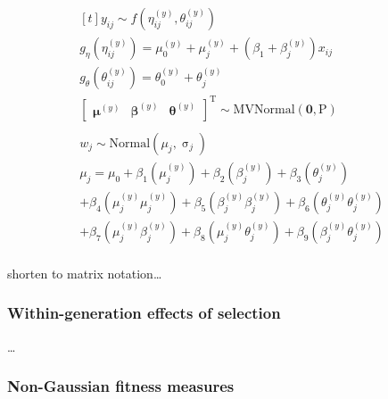 \documentclass{article}
\begin{document}
\begin{equation} \tag{3.1}\label{eq:3.1}
\begin{gathered}[t]
y_{ij} \sim f \left(\eta^{(y)}_{ij }, \theta^{(y)}_{ij} \right)  \\
g_\eta \left( \eta^{(y)}_{ij} \right) = \mu_0^{(y)} + \mu_j^{(y)}+ \left(\beta_1 + \beta_j^{(y)} \right) x_{ij} \nonumber \\
g_\theta \left( \theta^{(y)}_{ij} \right) = \theta_0^{(y)} + \theta_{j}^{(y)} \nonumber \\
\begin{bmatrix}
\boldsymbol{\mu}^{(y)} &
\boldsymbol{\beta}^{(y)} &
\boldsymbol{\theta}^{(y)} \end{bmatrix} ^\textrm{T}
 \sim \mathrm{M}\mathrm{VNormal} \left(
\boldsymbol{0},\boldsymbol{\mathrm{P}} \right) \nonumber \\ \nonumber \\
w_{j} \sim \mathrm{Normal} \left( \mu _{j}, \upsigma _{j} \right) \nonumber \\
\mu _{j} = \mu _0 + \beta_1 \left( \mu^{(y)}_{j} \right) + 
                \beta_2 \left( \beta_j^{(y)} \right) + 
                \beta_3 \left( \theta^{(y)}_{j} \right) \\ 
                + \beta_4 \left( \mu^{(y)}_j \mu^{(y)}_j \right) +
                \beta_5\left( \beta^{(y)}_j \beta^{(y)}_j \right) +
                \beta_6 \left( \theta^{(y)}_j \theta^{(y)}_j \right)\\ 
                +  \beta_7 \left( \mu^{(y)}_j \beta^{(y)}_j \right) + 
                \beta_8 \left( \mu^{(y)}_j \theta^{(y)}_j \right) + 
                 \beta_9 \left( \beta^{(y)}_j \theta^{(y)}_j \right) \nonumber \\ 
\end{gathered}
\end{equation}

shorten to matrix notation\ldots{}

\hypertarget{within-generation-effects-of-selection}{%
\subsubsection{Within-generation effects of
selection}\label{within-generation-effects-of-selection}}

\ldots{}

\hypertarget{non-gaussian-fitness-measures}{%
\subsubsection{Non-Gaussian fitness
measures}\label{non-gaussian-fitness-measures}}
\end{document}
